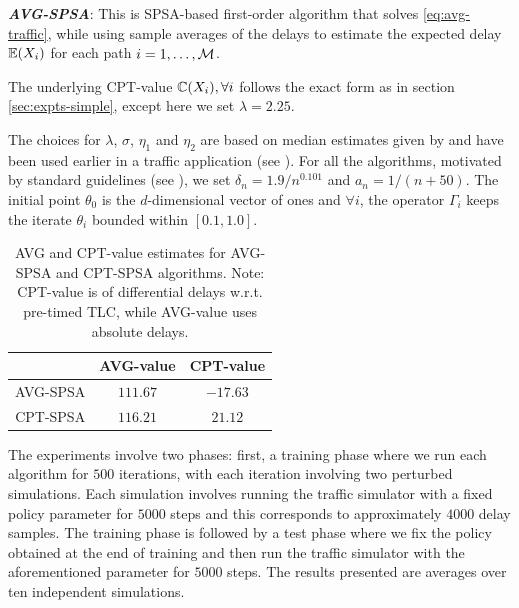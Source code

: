{\bf\em AVG-SPSA}: This is SPSA-based first-order algorithm that solves \eqref{eq:avg-traffic}, while using sample averages of the delays to estimate the expected delay $\mathbb{E}(X_i)$ for each path $i=1,\ldots,\mathcal{M}$. 

The underlying CPT-value $\mathbb{C}(X_i), \forall i$ follows the exact form as in section \ref{sec:expts-simple}, except here we set $\lambda = 2.25$.

The choices for $\lambda$, $\sigma$, $\eta_1$ and $\eta_2$ are based on median estimates given by \cite{tversky1992advances} and have been used earlier in a traffic application (see \cite{gao2010adaptive}).
For all the algorithms,
 motivated by standard guidelines (see \cite{spall2005introduction}),
 we set $\delta_n = 1.9/n^{0.101}$ and $a_n = 1/(n+50)$. The initial point $\theta_0$ is the $d$-dimensional vector of ones and $\forall i$, the operator $\Gamma_i$ keeps the iterate $\theta_i$ bounded within $[0.1, 1.0]$.

\begin{table}
 \centering
  \caption{AVG and CPT-value estimates for AVG-SPSA and CPT-SPSA algorithms. Note: CPT-value is of differential delays w.r.t. pre-timed TLC, while 
  AVG-value uses absolute delays.}
  \label{tab:cpt-results}
 \begin{tabular}{|c|c|c|}
  \toprule 
   & \textbf{AVG-value}& \textbf{CPT-value }\\\midrule
   AVG-SPSA & $\bm{111.67}$ & $-17.63$ \\\midrule
   CPT-SPSA & $116.21$ & $\bm{21.12}$\\
   \bottomrule
  \end{tabular}
%   
%   
\end{table}

 
The experiments involve two phases:
first, a training phase where we run each algorithm for $500$ iterations, with each iteration involving two perturbed simulations. Each simulation involves running the traffic simulator with a fixed policy parameter for $5000$ steps and this corresponds to approximately $4000$ delay samples. The training phase is followed by a test phase where we fix the policy obtained at the end of training and then run the traffic simulator with the aforementioned parameter for $5000$ steps. The results presented are averages over ten independent simulations.


